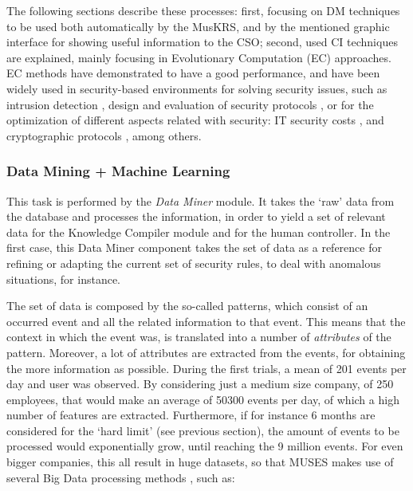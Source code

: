 The following sections describe these processes: first, focusing on DM techniques to be used both automatically by the MusKRS, and by the mentioned graphic interface for showing useful information to the CSO; second, used CI techniques are explained, mainly focusing in Evolutionary Computation (EC) \cite{EAs_Back96} approaches. EC methods have demonstrated to have a good performance, and have been widely used in security-based environments for solving security issues, such as intrusion detection \cite{GA_intrusion-majeed}, design and evaluation of security protocols \cite{GP_intrusion-lu,GA_networksecurity-zarza}, or for the optimization of different aspects related with security: IT security costs \cite{EAs_securitycosts-kirta}, and cryptographic protocols \cite{GA_cryptographicprotocols-zarza2}, among others.

%
\subsubsection{Data Mining + Machine Learning}
\label{subsubsec:dm_ml}

This task is performed by the \textit{Data Miner} module. It  takes the `raw' data from the database and processes the information, in order to yield a set of relevant data for the Knowledge Compiler module and for the human controller. In the first case, this Data Miner component takes the set of data as a reference for refining or adapting the current set of security rules, to deal with anomalous situations, for instance.

The set of data is composed by the so-called patterns, which consist of an occurred event 
and all the related information to that event. This means that the context in which the event was, is translated into a number of \textit{attributes} of the pattern. 
Moreover, a lot of attributes are extracted from the events, for obtaining the more information as possible. 
During the first trials, a mean of 201 events per day and user was observed. By considering just a medium size company, of 250 employees, that would make an average of 50300 events per day, of which a high number of features are extracted. Furthermore, if for instance 6 months are considered for the `hard limit' (see previous section), the amount of events to be processed would exponentially grow, until reaching the 9 million events. For even bigger companies, this all result in huge datasets, so that MUSES makes use of several Big Data processing methods \cite{BigData_11}, such as: 

